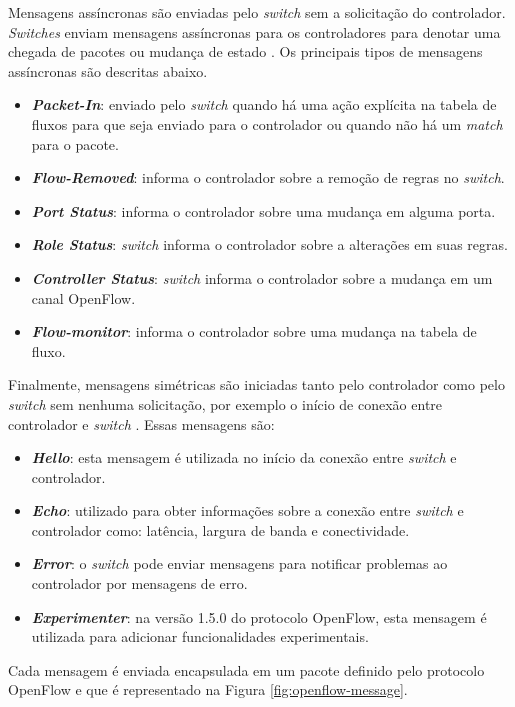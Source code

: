 Mensagens assíncronas são enviadas pelo \textit{switch} sem a solicitação do controlador. \textit{Switches} enviam mensagens assíncronas para os controladores para denotar uma chegada de pacotes ou mudança de estado \cite{OpenFlowSpec:2014}. Os principais tipos de mensagens assíncronas são descritas abaixo.
\begin{itemize}
    \item \textit{\textbf{Packet-In}}: enviado pelo \textit{switch} quando há uma ação explícita na tabela de fluxos para que seja enviado para o controlador ou quando não há um \textit{match} para o pacote.
    \item \textit{\textbf{Flow-Removed}}: informa o controlador sobre a remoção de regras no \textit{switch}.
    \item \textit{\textbf{Port Status}}: informa o controlador sobre uma mudança em alguma porta.
    \item \textit{\textbf{Role Status}}: \textit{switch} informa o controlador sobre a alterações em suas regras.
    \item \textit{\textbf{Controller Status}}: \textit{switch} informa o controlador sobre a mudança em um canal OpenFlow.
    \item \textit{\textbf{Flow-monitor}}: informa o controlador sobre uma mudança na tabela de fluxo.
\end{itemize}

Finalmente, mensagens simétricas são iniciadas tanto pelo controlador como pelo \textit{switch} sem nenhuma solicitação, por exemplo o início de conexão entre controlador e \textit{switch} \cite{OpenFlowSpec:2014}. Essas mensagens são:
\begin{itemize}
    \item \textit{\textbf{Hello}}: esta mensagem é utilizada no início da conexão entre \textit{switch} e controlador.
    \item \textit{\textbf{Echo}}: utilizado para obter informações sobre a conexão entre \textit{switch} e controlador como:
latência, largura de banda e conectividade.
    \item \textit{\textbf{Error}}:  o \textit{switch} pode enviar mensagens para notificar problemas ao controlador por mensagens de erro.
    \item \textit{\textbf{Experimenter}}: na versão 1.5.0 do protocolo OpenFlow, esta mensagem é utilizada para adicionar funcionalidades experimentais.
\end{itemize}

Cada mensagem é enviada encapsulada em um pacote definido pelo protocolo OpenFlow e que é representado na Figura \ref{fig:openflow-message}.

